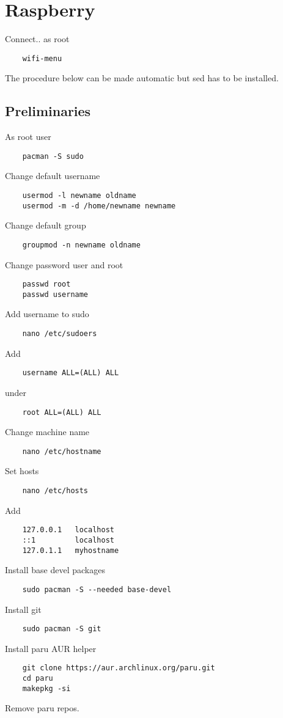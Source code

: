\documentclass[12pt]{article}
\begin{document}
\section*{Raspberry}
Connect.. as root
\begin{lstlisting}
    wifi-menu
\end{lstlisting}
The procedure below can be made automatic but sed has to be installed.

\subsection{Preliminaries}
As root user
\begin{lstlisting}
    pacman -S sudo
\end{lstlisting}
Change default username
\begin{lstlisting}
    usermod -l newname oldname
    usermod -m -d /home/newname newname
\end{lstlisting}
Change default group
\begin{lstlisting}
    groupmod -n newname oldname
\end{lstlisting}
Change password user and root
\begin{lstlisting}
    passwd root
    passwd username
\end{lstlisting}
Add username to sudo
\begin{lstlisting}
    nano /etc/sudoers
\end{lstlisting}
Add
\begin{lstlisting}
    username ALL=(ALL) ALL
\end{lstlisting}
under
\begin{lstlisting}
    root ALL=(ALL) ALL
\end{lstlisting}
Change machine name
\begin{lstlisting}
    nano /etc/hostname
\end{lstlisting}
Set hosts
\begin{lstlisting}
    nano /etc/hosts
\end{lstlisting}
Add
\begin{lstlisting}
    127.0.0.1	localhost
    ::1		    localhost
    127.0.1.1	myhostname
\end{lstlisting}
Install base devel packages
\begin{lstlisting}
    sudo pacman -S --needed base-devel
\end{lstlisting}
Install git
\begin{lstlisting}
    sudo pacman -S git
\end{lstlisting}
Install paru AUR helper
\begin{lstlisting}
    git clone https://aur.archlinux.org/paru.git
    cd paru
    makepkg -si
\end{lstlisting}
Remove paru repos.
\end{document}
